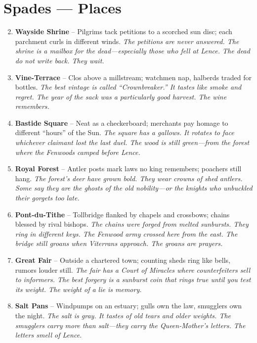 \section*{Spades --- Places}
\label{sec:vhasia-places}
\begin{enumerate}
\setcounter{enumi}{1}
\item \textbf{Wayside Shrine} -- Pilgrims tack petitions to a scorched sun disc; each parchment curls in different winds.
  \hfill \textit{The petitions are never answered. The shrine is a mailbox for the dead---especially those who fell at Lence. The dead do not write back. They wait.}
\item \textbf{Vine-Terrace} -- Clos above a millstream; watchmen nap, halberds traded for bottles.
  \hfill \textit{The best vintage is called ``Crownbreaker.'' It tastes like smoke and regret. The year of the sack was a particularly good harvest. The wine remembers.}
\item \textbf{Bastide Square} -- Neat as a checkerboard; merchants pay homage to different ``hours'' of the Sun.
  \hfill \textit{The square has a gallows. It rotates to face whichever claimant lost the last duel. The wood is still green---from the forest where the Fenwoods camped before Lence.}
\item \textbf{Royal Forest} -- Antler posts mark laws no king remembers; poachers still hang.
  \hfill \textit{The forest's deer have grown bold. They wear crowns of shed antlers. Some say they are the ghosts of the old nobility---or the knights who unbuckled their gorgets too late.}
\item \textbf{Pont-du-Tithe} -- Tollbridge flanked by chapels and crossbows; chains blessed by rival bishops.
  \hfill \textit{The chains were forged from melted sunbursts. They ring in different keys. The Fenwood army crossed here from the east. The bridge still groans when Viterrans approach. The groans are prayers.}
\item \textbf{Great Fair} -- Outside a chartered town; counting sheds ring like bells, rumors louder still.
  \hfill \textit{The fair has a Court of Miracles where counterfeiters sell to informers. The best forgery is a sunburst coin that rings true until you test its weight. The weight of a lie is memory.}
\item \textbf{Salt Pans} -- Windpumps on an estuary; gulls own the law, smugglers own the night.
  \hfill \textit{The salt is gray. It tastes of old tears and older weights. The smugglers carry more than salt---they carry the Queen-Mother's letters. The letters smell of Lence.}

\end{enumerate}
